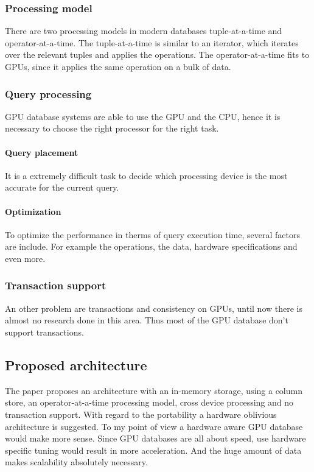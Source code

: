 \subsubsection{Processing model}
There are two processing models in modern databases tuple-at-a-time and operator-at-a-time.
The tuple-at-a-time is similar to an iterator, which iterates over the relevant tuples and applies the operations.
The operator-at-a-time fits to GPUs, since it applies the same operation on a bulk of data.

\subsubsection{Query processing}
GPU database systems are able to use the GPU and the CPU, hence it is necessary to choose the right processor for the right task.
\paragraph{Query placement} It is a extremely difficult task to decide which processing device is the most accurate for the current query.
\paragraph{Optimization} To optimize the performance in therms of query execution time, several factors are include.
For example the operations, the data, hardware specifications and even more.

\subsubsection{Transaction support}
An other problem are transactions and consistency on GPUs, until now there is almost no research done in this area.
Thus most of the GPU database don't support transactions.


\subsection{Proposed architecture}
The paper \cite{bress2014gpu} proposes an architecture with an in-memory storage, using a column store, an operator-at-a-time processing model, cross device processing and no transaction support.
With regard to the portability a hardware oblivious architecture is suggested.
To my point of view a hardware aware GPU database would make more sense.
Since GPU databases are all about speed, use hardware specific tuning would result in more acceleration.
And the huge amount of data makes scalability absolutely necessary.